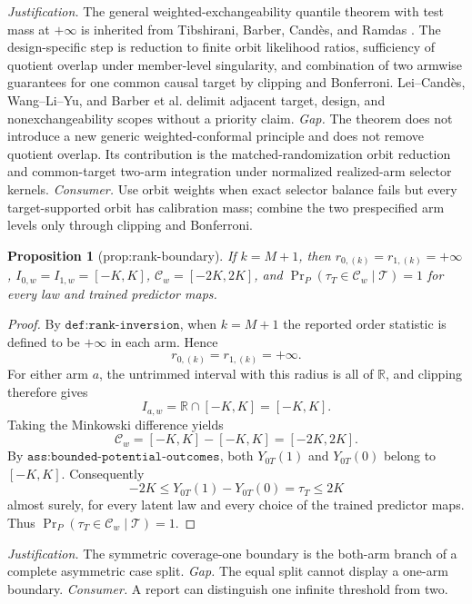 \documentclass{article}
\newtheorem{proposition}{Proposition}
\begin{document}
\par\smallskip\noindent \textit{Justification.} The general weighted-exchangeability quantile theorem with test mass at \(+\infty\) is inherited from Tibshirani, Barber, Candès, and Ramdas \cite{TibshiraniBarberCandesRamdas2019}. The design-specific step is reduction to finite orbit likelihood ratios, sufficiency of quotient overlap under member-level singularity, and combination of two armwise guarantees for one common causal target by clipping and Bonferroni. Lei--Candès, Wang--Li--Yu, and Barber et al. delimit adjacent target, design, and nonexchangeability scopes \cite{LeiCandes2021,WangLiYu2025,BarberCandesRamdasTibshirani2023} without a priority claim. \textit{Gap.} The theorem does not introduce a new generic weighted-conformal principle and does not remove quotient overlap. Its contribution is the matched-randomization orbit reduction and common-target two-arm integration under normalized realized-arm selector kernels. \textit{Consumer.} Use orbit weights when exact selector balance fails but every target-supported orbit has calibration mass; combine the two prespecified arm levels only through clipping and Bonferroni.

\begin{proposition}[prop:rank-boundary]\label{prop:rank-boundary}
If \(k=M+1\), then \(r_{0,(k)}=r_{1,(k)}=+\infty\), \(I_{0,w}=I_{1,w}=[-K,K]\), \(\mathcal C_w=[-2K,2K]\), and \(\Pr_P(\tau_T\in\mathcal C_w\mid\mathcal T)=1\) for every law and trained predictor maps.
\end{proposition}
\begin{proof}
By \(\texttt{def:rank-inversion}\), when \(k=M+1\) the reported order statistic is defined to be \(+\infty\) in each arm. Hence
\[r_{0,(k)}=r_{1,(k)}=+\infty.\]
For either arm \(a\), the untrimmed interval with this radius is all of \(\mathbb R\), and clipping therefore gives
\[I_{a,w}=\mathbb R\cap[-K,K]=[-K,K].\]
Taking the Minkowski difference yields
\[\mathcal C_w=[-K,K]-[-K,K]=[-2K,2K].\]
By \(\texttt{ass:bounded-potential-outcomes}\), both \(Y_{0T}(1)\) and \(Y_{0T}(0)\) belong to \([-K,K]\). Consequently
\[-2K\le Y_{0T}(1)-Y_{0T}(0)=\tau_T\le2K\]
almost surely, for every latent law and every choice of the trained predictor maps. Thus \(\Pr_P(\tau_T\in\mathcal C_w\mid\mathcal T)=1\).
\end{proof}
\par\smallskip\noindent \textit{Justification.} The symmetric coverage-one boundary is the both-arm branch of a complete asymmetric case split. \textit{Gap.} The equal split cannot display a one-arm boundary. \textit{Consumer.} A report can distinguish one infinite threshold from two.
\end{document}
